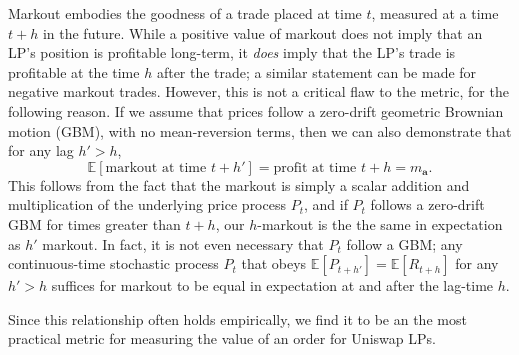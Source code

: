     Markout embodies the goodness of a trade placed at time $t$, measured at a time $t+h$ in the future. While a positive value of markout does not imply that an LP's position is profitable long-term, it \textit{does} imply that the LP's trade is profitable at the time $h$ after the trade; a similar statement can be made for negative markout trades. However, this is not a critical flaw to the metric, for the following reason. If we assume that prices follow a zero-drift geometric Brownian motion (GBM), with no mean-reversion terms, then we can also demonstrate that for any lag $h' > h$, $$\mathbb E[\text{markout at time } t + h'] = \text{profit at time } t+h = m_\textbf{a}.$$ %
    This follows from the fact that the markout is simply a scalar addition and multiplication of the underlying price process $P_t$, and if $P_t$ follows a zero-drift GBM for times greater than $t+h$, our $h$-markout is the the same in expectation as $h'$ markout. In fact, it is not even necessary that $P_t$ follow a GBM; any continuous-time stochastic process $P_t$ that obeys $\mathbb E[P_{t+h'}] = \mathbb E[R_{t+h}]$ for any $h' > h$ suffices for markout to be equal in expectation at and after the lag-time $h$.

    Since this relationship often holds empirically, we find it to be an the most practical metric for measuring the value of an order for Uniswap LPs.



